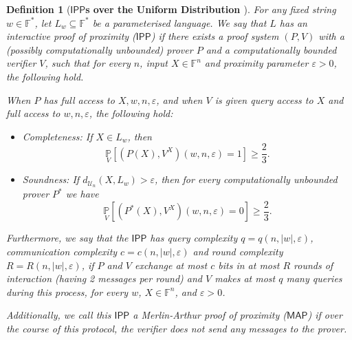 \documentclass[10pt,a4paper]{article}
\newtheorem{definition}{Definition}[section]
\newcommand{\IPP}{\mathsf{IPP}}
\newcommand{\MAP}{\mathsf{MAP}}
\newcommand{\F}{\mathbb{F}}
\begin{document}
\begin{definition}[\textbf{$\IPP$s over the Uniform Distribution \cite{EKR04, RVW}}]
\label{def:uniform_ipp}
For any fixed string $w \in \F^*$, let $L_w \subseteq \F^*$ be a parameterised language. We say that $L$ has an interactive proof of proximity ($\IPP$) if there exists a proof system $(P,V)$ with a (possibly computationally unbounded) prover $P$ and a computationally bounded verifier $V$, such that for every $n$, input $X \in \F^n$ and proximity parameter $\varepsilon > 0$, the following hold.

When $P$ has full access to $X,w,n,\varepsilon$, and when $V$ is given query access to $X$ and full access to $w,n,\varepsilon$, the following hold:
\begin{itemize}
    \item Completeness: If $X \in L_w$, then
    \begin{equation*}
        \underset{V}{\mathbb{P}}\left[ (P(X),V^{X})(w, n, \varepsilon)=1 \right]\geq \frac{2}{3}.
    \end{equation*}

    \item Soundness: If $d_{\mathcal{U}_{n}}(X, L_w)>\varepsilon$, then for every computationally unbounded prover $P^{\ast}$ we have 
    \begin{equation*}
        \underset{V}{\mathbb{P}}\left[(P^{\ast}(X),V^{X})(w,n,\varepsilon)=0\right]\geq \frac{2}{3}.
    \end{equation*}
\end{itemize}

Furthermore, we say that the $\IPP$ has \textit{query complexity} $q = q(n, \vert w \vert, \varepsilon)$, \textit{communication complexity} $c = c(n, \vert w \vert, \varepsilon)$ and \textit{round complexity} $R = R(n, \vert w \vert, \varepsilon)$, if $P$ and $V$ exchange at most $c$ bits in at most $R$ rounds of interaction (having 2 messages per round) and $V$ makes at most $q$ many queries during this process, for every $w$, $X \in \F^n$, and $\varepsilon > 0$.

Additionally, we call this $\IPP$ a Merlin-Arthur proof of proximity ($\MAP$) if over the course of this protocol, the verifier does not send any messages to the prover.
\end{definition}
\end{document}
